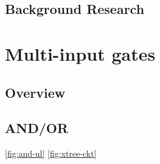 \documentclass[12pt]{report}
\begin{document}
\section{Background Research}

\cite{efficient-error}
\cite{multiple-defect}
\cite{incremental}
\cite{exclusive-test}
\cite{modeling-unknown}

\chapter{Multi-input gates}
\label{sec:mig}

\section{Overview}

\section{AND/OR}

\cref{fig:and-ul}
\cref{fig:xtree-ckt}
\end{document}
